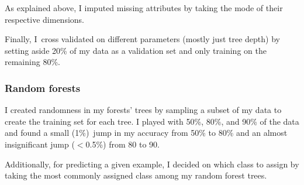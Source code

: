 \documentclass{report}
\begin{document}
As explained above, I imputed missing attributes by taking the mode of their respective dimensions. \newline

Finally, I\ cross validated on different parameters (mostly just tree depth) by setting aside 20\% of my data as a validation set and only training on the remaining 80\%.

\subsubsection*{Random forests}
I created randomness in my forests' trees by sampling a subset of my data to create the training set for each tree. I played with 50\%, 80\%, and 90\% of the data and found a small (1\%)\ jump in my accuracy from 50\% to 80\% and an almost insignificant jump ($<$0.5\%) from 80 to 90. \newline

Additionally, for predicting a given example, I decided on which class to assign by taking the most commonly assigned class among my random forest trees.
\end{document}
